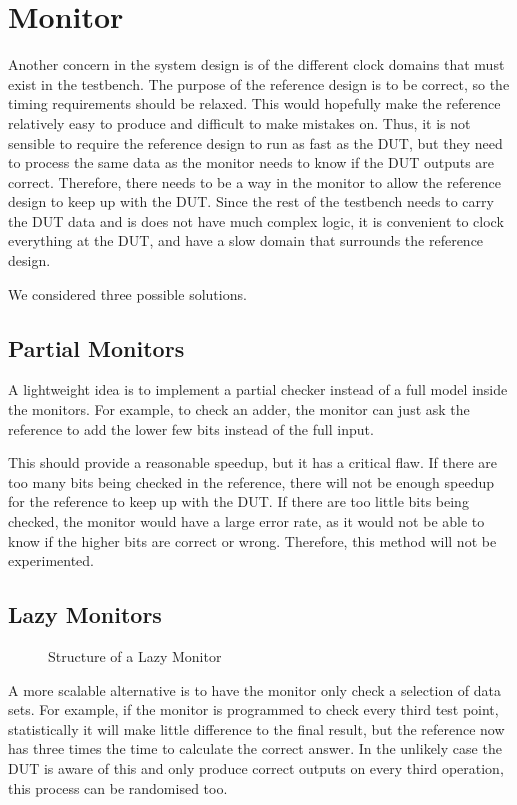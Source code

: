 \section{Monitor}
Another concern in the system design is of the different clock domains that must exist in the testbench.
The purpose of the reference design is to be correct, so the timing requirements should be relaxed.
This would hopefully make the reference relatively easy to produce and difficult to make mistakes on.
Thus, it is not sensible to require the reference design to run as fast as the DUT, but they need to process the same data as the monitor needs to know if the DUT outputs are correct.
Therefore, there needs to be a way in the monitor to allow the reference design to keep up with the DUT.
Since the rest of the testbench needs to carry the DUT data and is does not have much complex logic, it is convenient to clock everything at the DUT, and have a slow domain that surrounds the reference design.

We considered three possible solutions.

\subsection{Partial Monitors}
A lightweight idea is to implement a partial checker instead of a full model inside the monitors.
For example, to check an adder, the monitor can just ask the reference to add the lower few bits instead of the full input.

This should provide a reasonable speedup, but it has a critical flaw.
If there are too many bits being checked in the reference, there will not be enough speedup for the reference to keep up with the DUT.
If there are too little bits being checked, the monitor would have a large error rate, as it would not be able to know if the higher bits are correct or wrong.
Therefore, this method will not be experimented.

\subsection{Lazy Monitors}

\begin{figure}[H]
  \centering
  
  \caption{Structure of a Lazy Monitor}
  \label{LazMon}
\end{figure}

A more scalable alternative is to have the monitor only check a selection of data sets.
For example, if the monitor is programmed to check every third test point, statistically it will make little difference to the final result, but the reference now has three times the time to calculate the correct answer.
In the unlikely case the DUT is aware of this and only produce correct outputs on every third operation, this process can be randomised too.

